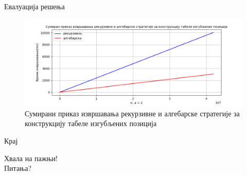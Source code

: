 \documentclass[10pt]{beamer}
\begin{document}
\begin{frame}{Евалуација решења}	
	\begin{figure}[H]
		\begin{center}
			\includegraphics[width=\textwidth]{../src/statistics/picture/algebraicVSrecursive.png}
		\end{center}
		\caption*{Сумирани приказ извршавања рекурзивне и алгебарске стратегије за конструкцију табеле изгубљених позиција}
	\end{figure}
\end{frame}

\begin{frame}{Крај}
	\begin{center}
		Хвала на пажњи!\\
		Питања?
	\end{center}
\end{frame}
\end{document}
